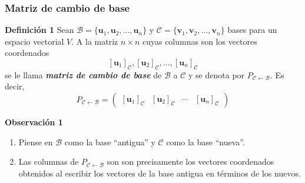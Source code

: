 {\nologo
\begin{frame}\frametitle{Matriz de cambio de base}

\begin{defi}{\textbf{Definición 1}}\justifying
	Sean $\mathcal{B}=\{\mathbf{u}_1, \mathbf{u}_2, \hdots , \mathbf{u}_n \}$ y $\mathcal{C}=\{\mathbf{v}_1, \mathbf{v}_2, \hdots , \mathbf{v}_n \}$  bases para un espacio  vectorial $V$. A la matriz $n\times n$ cuyas columnas son los vectores coordenados
	\[
		\left[ \mathbf{u}_1 \right]_{\mathcal{C}}, \left[ \mathbf{u}_2 \right]_{\mathcal{C}}, \hdots, \left[ \mathbf{u}_n \right]_{\mathcal{C}}
	\]
	se le llama \textbf{\textit{matriz de cambio de base}} de $\mathcal{B}$ a $\mathcal{C}$ y se denota por $P_{\mathcal{C} \leftarrow\mathcal{B}}$. Es decir,	
	\[	
		P_{\mathcal{C} \leftarrow\mathcal{B}} =
		\left( 
			\begin{array}{c|c|c|c} \left[ \mathbf{u}_1 \right]_{\mathcal{C}} & \left[ \mathbf{u}_2 \right]_{\mathcal{C}} & \cdots & \left[ \mathbf{u}_n \right]_{\mathcal{C}}
			\end{array} 
		\right)
	\]
\end{defi}	

\vspace{0mm}

\begin{alertblock}{\textbf{Observación 1}}
	\begin{enumerate}
		\item[\labelname{$a$}] Piense en $\mathcal{B}$ como la base ``antigua'' y $\mathcal{C}$ como la base ``nueva''.
		\item[\labelname{$b$}] Las columnas de $P_{\mathcal{C} \leftarrow\mathcal{B}}$ son son precisamente los vectores 
		coordenados obtenidos al escribir los vectores de la base antigua en términos de los nuevos.
	\end{enumerate}
\end{alertblock}

\end{frame}
}


\subsection{}

